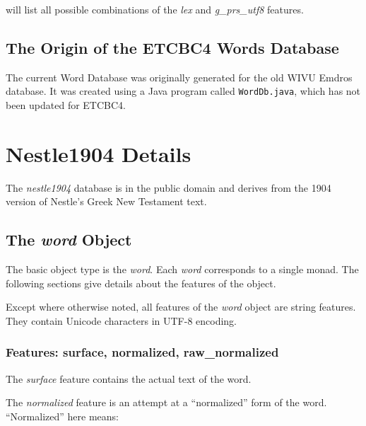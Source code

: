 \documentclass[11pt,oneside,a4paper]{memoir}
\begin{document}
\noindent
will list all possible combinations of the \emph{lex} and \emph{g\_prs\_utf8} features.

\section{The Origin of the ETCBC4 Words Database}

The current Word Database was originally generated for the old WIVU Emdros database. It
was created using a Java program called \texttt{WordDb.java}, which has not been updated for ETCBC4.


\chapter{Nestle1904 Details}\label{app-nestle}

The \emph{nestle1904} database is in the public domain and derives from the 1904
version of Nestle's Greek New Testament text.

\section{The \emph{word} Object}

The basic object type is the \emph{word}. Each \emph{word} corresponds to a
single monad. The following sections give details about the features of the object.

Except where otherwise noted, all features of the \emph{word} object are string features. They
contain Unicode characters in UTF-8 encoding.

\subsection{Features: surface, normalized, raw\_normalized}

The \emph{surface} feature contains the actual text of the word.

The \emph{normalized} feature is an attempt at a ``normalized'' form of the word. ``Normalized''
here means:
\end{document}
